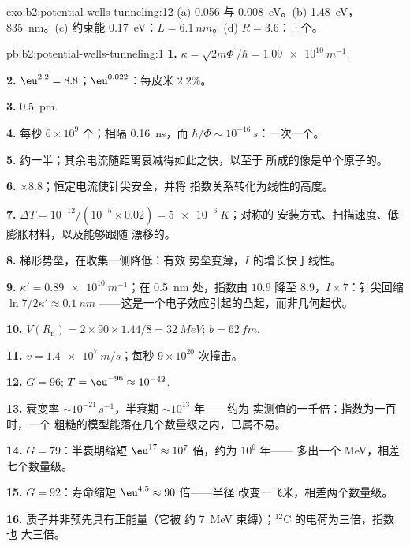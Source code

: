 \begin{solution}{exo:b2:potential-wells-tunneling:12}
(a) \qty{0.056}{} 与 \qty{0.008}{eV}。(b) \qty{1.48}{eV}，\qty{835}{nm}。(c) 约束能
\qty{0.17}{eV}：$L = \qty{6.1}{nm}$。(d) $R = 3.6$：三个。
\end{solution}

\begin{solution}{pb:b2:potential-wells-tunneling:1}
\textbf{1.} $\kappa = \sqrt{2m\Phi}/\hbar = \qty{1.09e10}{m^{-1}}$.

\textbf{2.} $\eu^{2.2} = 8.8$；$\eu^{0.022}$：每皮米 $2.2\%$。

\textbf{3.} \qty{0.5}{pm}.

\textbf{4.} 每秒 $6 \times 10^9$ 个；相隔 \qty{0.16}{ns}，而 $\hbar/\Phi
\sim 10^{-16}\,\unit{s}$：一次一个。

\textbf{5.} 约一半；其余电流随距离衰减得如此之快，以至于
所成的像是单个原子的。

\textbf{6.} $\times 8.8$；恒定电流使针尖安全，并将
指数关系转化为线性的高度。

\textbf{7.} $\Delta T = 10^{-12}/(10^{-5} \times 0.02) = \qty{5e-6}{K}$；对称的
安装方式、扫描速度、低膨胀材料，以及能够跟随
漂移的。

\textbf{8.} 梯形势垒，在收集一侧降低：有效
势垒变薄，$I$ 的增长快于线性。

\textbf{9.} $\kappa' = \qty{0.89e10}{m^{-1}}$；在 \qty{0.5}{nm} 处，指数由
$10.9$ 降至 $8.9$，$I \times 7$：针尖回缩 $\ln 7/2\kappa' \approx \qty{0.1}{nm}$
——这是一个电子效应引起的凸起，而非几何起伏。

\textbf{10.} $V(R_{\text{n}}) = 2 \times 90 \times 1.44/8 = \qty{32}{MeV}$; $b = \qty{62}{fm}$.

\textbf{11.} $v = \qty{1.4e7}{m/s}$；每秒 $9 \times 10^{20}$ 次撞击。

\textbf{12.} $G = 96$; $T = \eu^{-96} \approx 10^{-42}$.

\textbf{13.} 衰变率 $\sim 10^{-21}\,\unit{s^{-1}}$，半衰期 $\sim 10^{13}$ 年——约为
实测值的一千倍：指数为一百时，一个
粗糙的模型能落在几个数量级之内，已属不易。

\textbf{14.} $G = 79$：半衰期缩短 $\eu^{17} \approx 10^7$ 倍，约为 $10^6$ 年——
多出一个 MeV，相差七个数量级。

\textbf{15.} $G = 92$：寿命缩短 $\eu^{4.5} \approx 90$ 倍——半径
改变一飞米，相差两个数量级。

\textbf{16.} 质子并非预先具有正能量（它被
约 \qty{7}{MeV} 束缚）；$^{12}$C 的电荷为三倍，指数也
大三倍。


\end{solution}
